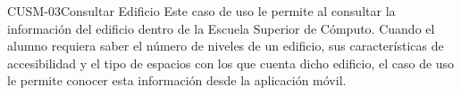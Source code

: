 \begin{UseCase}{CUSM-03}{Consultar Edificio}
    {
	Este caso de uso le permite al  consultar la información del edificio dentro de la Escuela Superior de Cómputo.
	Cuando el alumno requiera saber el número de niveles de un edificio, sus características de accesibilidad y el tipo de espacios con los que cuenta dicho edificio, el caso de uso le permite conocer esta información desde la aplicación móvil.
    }


%			


\end{UseCase}

